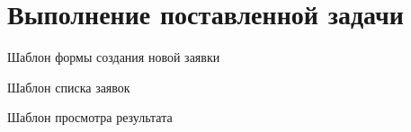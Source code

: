 


\setcounter{page}{2}
\def\contentsname{СОДЕРЖАНИЕ\vspace{10mm}}
\tableofcontents
\clearpage






\chapter{Выполнение поставленной задачи}










\lstset{ %
  language=HTML,
  basicstyle=\scriptsize
}
\centerline{Шаблон формы создания новой заявки}


\centerline{Шаблон списка заявок}


\centerline{Шаблон просмотра результата}



